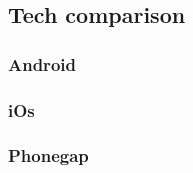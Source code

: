 \subsection{Tech comparison}

\subsubsection{Android}

\subsubsection{iOs}

\subsubsection{Phonegap}
